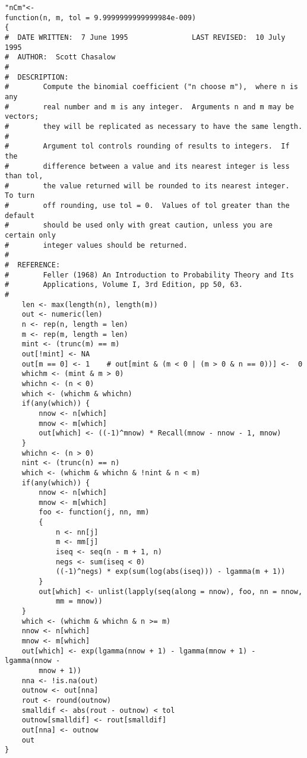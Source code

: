 {\begin{lstlisting}
"nCm"<-
function(n, m, tol = 9.9999999999999984e-009)
{
#  DATE WRITTEN:  7 June 1995               LAST REVISED:  10 July 1995
#  AUTHOR:  Scott Chasalow
#
#  DESCRIPTION: 
#        Compute the binomial coefficient ("n choose m"),  where n is any 
#        real number and m is any integer.  Arguments n and m may be vectors;
#        they will be replicated as necessary to have the same length.
#
#        Argument tol controls rounding of results to integers.  If the
#        difference between a value and its nearest integer is less than tol,  
#        the value returned will be rounded to its nearest integer.  To turn
#        off rounding, use tol = 0.  Values of tol greater than the default
#        should be used only with great caution, unless you are certain only
#        integer values should be returned.
#
#  REFERENCE: 
#        Feller (1968) An Introduction to Probability Theory and Its 
#        Applications, Volume I, 3rd Edition, pp 50, 63.
#
	len <- max(length(n), length(m))
	out <- numeric(len)
	n <- rep(n, length = len)
	m <- rep(m, length = len)
	mint <- (trunc(m) == m)
	out[!mint] <- NA
	out[m == 0] <- 1	# out[mint & (m < 0 | (m > 0 & n == 0))] <-  0
	whichm <- (mint & m > 0)
	whichn <- (n < 0)
	which <- (whichm & whichn)
	if(any(which)) {
		nnow <- n[which]
		mnow <- m[which]
		out[which] <- ((-1)^mnow) * Recall(mnow - nnow - 1, mnow)
	}
	whichn <- (n > 0)
	nint <- (trunc(n) == n)
	which <- (whichm & whichn & !nint & n < m)
	if(any(which)) {
		nnow <- n[which]
		mnow <- m[which]
		foo <- function(j, nn, mm)
		{
			n <- nn[j]
			m <- mm[j]
			iseq <- seq(n - m + 1, n)
			negs <- sum(iseq < 0)
			((-1)^negs) * exp(sum(log(abs(iseq))) - lgamma(m + 1))
		}
		out[which] <- unlist(lapply(seq(along = nnow), foo, nn = nnow, 
			mm = mnow))
	}
	which <- (whichm & whichn & n >= m)
	nnow <- n[which]
	mnow <- m[which]
	out[which] <- exp(lgamma(nnow + 1) - lgamma(mnow + 1) - lgamma(nnow - 
		mnow + 1))
	nna <- !is.na(out)
	outnow <- out[nna]
	rout <- round(outnow)
	smalldif <- abs(rout - outnow) < tol
	outnow[smalldif] <- rout[smalldif]
	out[nna] <- outnow
	out
}
\end{lstlisting}
}



